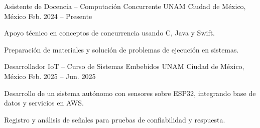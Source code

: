 \begin{cventries}

  \cventry
    {Asistente de Docencia – Computación Concurrente}
    {UNAM}
    {Ciudad de México, México}
    {Feb. 2024 -- Presente}
    {
      \begin{cvitems}
        \item {Apoyo técnico en conceptos de concurrencia usando C, Java y Swift.}
        \item {Preparación de materiales y solución de problemas de ejecución en sistemas.}
      \end{cvitems}
    }

  \cventry
    {Desarrollador IoT – Curso de Sistemas Embebidos}
    {UNAM}
    {Ciudad de México, México}
    {Feb. 2025 -- Jun. 2025}
    {
      \begin{cvitems}
        \item {Desarrollo de un sistema autónomo con sensores sobre ESP32, integrando base de datos y servicios en AWS.}
        \item {Registro y análisis de señales para pruebas de confiabilidad y respuesta.}
      \end{cvitems}
    }

\end{cventries}
